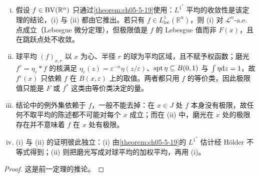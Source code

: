\documentclass[../../main.tex]{subfiles}%
\begin{document}
\begin{remark}\label{remark:ch05-thm-5-20-条件}
\begin{enumerate}[(i)]
\item 假设 $f\in\mathrm{BV}(\mathbb{R}^n)$ 只通过\cref{theorem:ch05-5-19}使用：$L^{1^{*}}$ 平均的收敛性是该定理的结论，(i) 与 (ii) 都由它推出。若只有 $f\in L^{1}_{\mathrm{loc}}(\mathbb{R}^n)$，则 (i) 对 $\mathcal{L}^n$-a.e. 点成立（Lebesgue 微分定理），但极限值是 $f$ 的 Lebesgue 值而非 $F(x)$，且在跳跃点处不收敛。%
\item 球平均 $(f)_{x,r}$ 以 $x$ 为心、半径 $r$ 的球为平均区域，且不赋予权函数；磨光 $f^{\varepsilon}=\eta_\varepsilon*f$ 的核满足 $\eta_\varepsilon(z)=\varepsilon^{-n}\eta(z/\varepsilon)$、$\operatorname{spt}\eta\subseteq B(0,1)$ 与 $\int\eta\mathrm{d} z=1$，故 $f^{\varepsilon}(x)$ 只依赖 $f$ 在 $B(x,\varepsilon)$ 上的取值。两者都只用 $f$ 的等价类，因此极限值只能是 $F$ 或 $f^{*}$ 这类由等价类决定的量。
\item 结论中的例外集依赖于 $f$，一般不能去掉：在 $x\in J$ 处 $f$ 本身没有极限，故任何不取平均的陈述都不可能对每个 $x$ 成立；而在 (ii) 中，磨光在 $x$ 处的极限存在并不意味着 $f$ 在 $x$ 处有极限。
\item (i) 与 (ii) 的证明彼此独立：(i) 由\cref{theorem:ch05-5-19}的 $L^{1^{*}}$ 估计经 Hölder 不等式得到；(ii) 则把磨光写成对球平均的加权平均，再用 (i)。%
\end{enumerate}
\end{remark}

\begin{proof}
这是前一定理的推论。
\end{proof}
\end{document}
